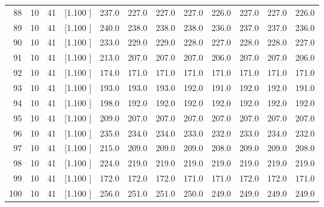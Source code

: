 \documentclass[12pt,a4paper]{article}
\begin{document}
\begin{center}
{\begin{tabular}{r r r r r r r r r r r r}
  88& 10& 41&[1.100     ]&   237.0&   227.0&   227.0&   227.0&   226.0&   227.0&   227.0&   226.0\\[-0.02in]
  89& 10& 41&[1.100     ]&   240.0&   238.0&   238.0&   238.0&   236.0&   237.0&   237.0&   236.0\\[-0.02in]
  90& 10& 41&[1.100     ]&   233.0&   229.0&   229.0&   228.0&   227.0&   228.0&   228.0&   227.0\\[-0.02in]
  91& 10& 41&[1.100     ]&   213.0&   207.0&   207.0&   207.0&   206.0&   207.0&   207.0&   206.0\\[-0.02in]
  92& 10& 41&[1.100     ]&   174.0&   171.0&   171.0&   171.0&   171.0&   171.0&   171.0&   171.0\\[-0.02in]
  93& 10& 41&[1.100     ]&   193.0&   193.0&   193.0&   192.0&   191.0&   192.0&   192.0&   191.0\\[-0.02in]
  94& 10& 41&[1.100     ]&   198.0&   192.0&   192.0&   192.0&   192.0&   192.0&   192.0&   192.0\\[-0.02in]
  95& 10& 41&[1.100     ]&   209.0&   207.0&   207.0&   207.0&   207.0&   207.0&   207.0&   207.0\\[-0.02in]
  96& 10& 41&[1.100     ]&   235.0&   234.0&   234.0&   233.0&   232.0&   233.0&   234.0&   232.0\\[-0.02in]
  97& 10& 41&[1.100     ]&   215.0&   209.0&   209.0&   209.0&   208.0&   209.0&   209.0&   208.0\\[-0.02in]
  98& 10& 41&[1.100     ]&   224.0&   219.0&   219.0&   219.0&   219.0&   219.0&   219.0&   219.0\\[-0.02in]
  99& 10& 41&[1.100     ]&   172.0&   172.0&   172.0&   171.0&   171.0&   172.0&   172.0&   171.0\\[-0.02in]
 100& 10& 41&[1.100     ]&   256.0&   251.0&   251.0&   250.0&   249.0&   249.0&   249.0&   249.0\\[-0.02in]

\hline
\end{tabular}}
\end{center}
\end{document}
